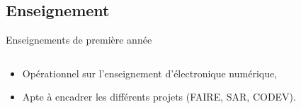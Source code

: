 \documentclass[t,compress,mathserif,12pt,xcolor=dvipsnames]{beamer}
\begin{document}
\subsection{Enseignement}
\begin{frame}[t]{Enseignements de première année}
  \begin{minipage}[t][5.0cm][t]{\textwidth}
    \begin{columns}[T]
      \begin{column}{0.63\textwidth}
          \begin{itemize}
            \item<+-> Opérationnel sur l'enseignement d'électronique numérique,
            \item<+-> Apte à encadrer les différents projets (FAIRE, SAR, CODEV).
          \end{itemize}
      \end{column}
      \begin{column}{0.04\textwidth}

      \end{column}
      \begin{column}{0.33\textwidth}
      \end{column}
    \end{columns}
  \end{minipage}
  \begin{figure}[htp]
    \centering
  \end{figure}


\end{frame}
\end{document}
